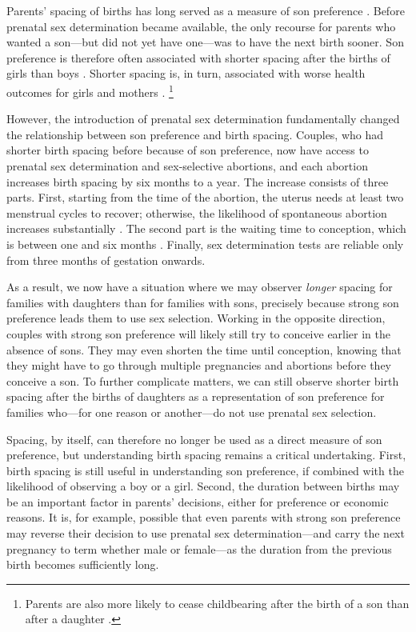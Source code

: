 \documentclass[12pt,letterpaper]{article}
\begin{document}
Parents' spacing of births has long served as a measure of son preference 
\citep{Leung1988}.
Before prenatal sex determination became available, the only recourse for 
parents who wanted a son---but did not yet have one---was to have the next 
birth sooner.
Son preference is therefore often associated with shorter spacing after the 
births of girls than boys 
\citep{Das1987,Rahman1993,Pong1994,Haughton1996,Arnold1997,Soest2012,Rossi2015}.
Shorter spacing is, in turn, associated with worse health outcomes for girls 
and mothers 
\citep{arnold98,Conde-Agudelo2000,Whitworth2002,Razzaque2005,Rutstein2005,Conde-Agudelo2006}.%
\footnote{
Parents are also more likely to cease childbearing after the birth of 
a son than after a daughter 
\citep{repetto72,ben-porath76b,Das1987,Arnold1997,arnold98,clark00,dreze01,filmer09,Basu2010,Altindag2016}.
}

However, the introduction of prenatal sex determination fundamentally changed the 
relationship between son preference and birth spacing.
Couples, who had shorter birth spacing before because of son preference,
now have access to prenatal sex determination and sex-selective abortions,
and each abortion increases birth spacing by six months to a year.
The increase consists of three parts.
First, starting from the time of the abortion, the uterus needs at 
least two menstrual cycles to recover;  otherwise, the likelihood 
of spontaneous abortion increases substantially \citep{zhou00b}.
The second part is the waiting time to conception, which is between 
one and six months \citep{Wang2003}.
Finally, sex determination tests are reliable only from three months 
of gestation onwards.

As a result, we now have a situation where we may observer \emph{longer} spacing
for families with daughters than for families with sons, precisely because
strong son preference leads them to use sex selection.
Working in the opposite direction, couples with strong son preference
will likely still try to conceive earlier in the absence of sons. 
They may even shorten the time until conception, knowing that they might
have to go through multiple pregnancies and abortions before they
conceive a son.
To further complicate matters, we can still observe shorter birth spacing 
after the births of daughters as a representation of son preference for 
families who---for one reason or another---do not use prenatal sex selection.

Spacing, by itself, can therefore no longer be used as a direct measure of 
son preference, but understanding birth spacing remains a critical undertaking.
First, 
birth spacing is still useful in understanding son preference, 
if combined with the likelihood of observing a boy or a girl.
Second, 
the duration between births may be an important factor in parents' 
decisions, either for preference or economic reasons.
It is, for example, possible that even parents with strong son preference 
may reverse their decision to use prenatal sex determination---and carry 
the next pregnancy to term whether male or female---as the duration from 
the previous birth becomes sufficiently long.
\end{document}
